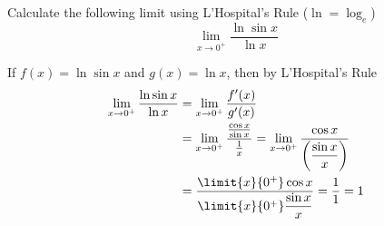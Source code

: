 

\question[2] Calculate the following limit using L'Hospital's Rule ($\ln = \log_e$)
$$\lim_{x\rightarrow 0^+}\dfrac{\ln\sin x}{\ln x}$$


\ifprintanswers
\fi 

\begin{solution}[\halfpage]
  If $f(x) = \ln\sin x$ and $g(x) = \ln x$, then by L'Hospital's Rule
  \begin{align}
    \lim_{x\to 0^+}\dfrac{\ln\sin x}{\ln x} &= \lim_{x\to 0^+}\dfrac{f'(x)}{g'(x)} \\
    &= \lim_{x\to 0^+}\dfrac{\frac{\cos x}{\sin x}}{\frac{1}{x}}
     = \lim_{x\to 0^+}\dfrac{\cos x}{\left(\dfrac{\sin x}{x}\right)} \\
     &= \dfrac{\limit{x}{0^+}\cos x}{\limit{x}{0^+}\dfrac{\sin x}{x}} = \dfrac{1}{1} = 1
  \end{align}
\end{solution}


